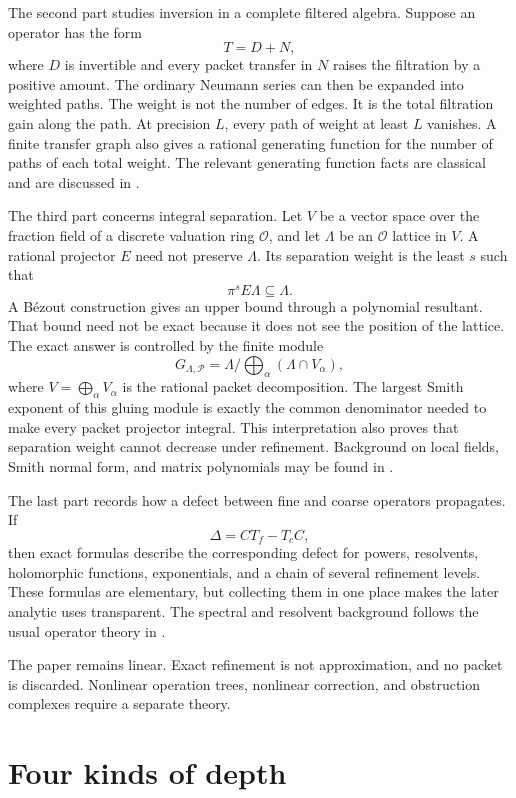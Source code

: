 \documentclass{aomart}
\theoremstyle{definition}
\theoremstyle{remark}
\newcommand{\OO}{\mathcal O}
\newcommand{\Pcal}{\mathcal P}
\begin{document}
The second part studies inversion in a complete filtered algebra.  Suppose an operator has the form
\[
T=D+N,
\]
where $D$ is invertible and every packet transfer in $N$ raises the filtration by a positive amount.  The ordinary Neumann series can then be expanded into weighted paths.  The weight is not the number of edges.  It is the total filtration gain along the path.  At precision $L$, every path of weight at least $L$ vanishes.  A finite transfer graph also gives a rational generating function for the number of paths of each total weight.  The relevant generating function facts are classical and are discussed in \cite{Stanley2012}.

The third part concerns integral separation.  Let $V$ be a vector space over the fraction field of a discrete valuation ring $\OO$, and let $\Lambda$ be an $\OO$ lattice in $V$.  A rational projector $E$ need not preserve $\Lambda$.  Its separation weight is the least $s$ such that
\[
\pi^sE\Lambda\subseteq\Lambda.
\]
A Bézout construction gives an upper bound through a polynomial resultant.  That bound need not be exact because it does not see the position of the lattice.  The exact answer is controlled by the finite module
\[
G_{\Lambda,\Pcal}
=
\Lambda\Big/\bigoplus_{\alpha}(\Lambda\cap V_\alpha),
\]
where $V=\bigoplus_\alpha V_\alpha$ is the rational packet decomposition.  The largest Smith exponent of this gluing module is exactly the common denominator needed to make every packet projector integral.  This interpretation also proves that separation weight cannot decrease under refinement.  Background on local fields, Smith normal form, and matrix polynomials may be found in \cite{Serre1979,Newman1972,GohbergLancasterRodman2009}.

The last part records how a defect between fine and coarse operators propagates.  If
\[
\Delta=CT_f-T_cC,
\]
then exact formulas describe the corresponding defect for powers, resolvents, holomorphic functions, exponentials, and a chain of several refinement levels.  These formulas are elementary, but collecting them in one place makes the later analytic uses transparent.  The spectral and resolvent background follows the usual operator theory in \cite{Kato1995}.

The paper remains linear.  Exact refinement is not approximation, and no packet is discarded.  Nonlinear operation trees, nonlinear correction, and obstruction complexes require a separate theory.

\section{Four kinds of depth}\label{sec:four_depths}
\end{document}
